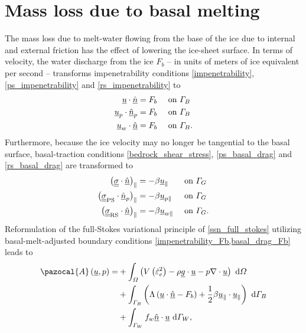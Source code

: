 \section{Mass loss due to basal melting} \label{ssn_mass_loss_due_to_melting}

The mass loss due to melt-water flowing from the base of the ice due to internal and external friction has the effect of lowering the ice-sheet surface.  In terms of velocity, the water discharge from the ice $F_b$ -- in units of meters of ice equivalent per second -- transforms impenetrability conditions \cref{impenetrability}, \cref{ps_impenetrability} and \cref{rs_impenetrability} to
\begin{align}
  \label{impenetrability_Fb}
  \underline{u} \cdot \underline{\hat{n}} &= F_b  &&\text{ on } \varGamma_B \\
  \label{ps_impenetrability_Fb}
  \underline{u}_p \cdot \underline{\hat{n}}_p &= F_b  &&\text{ on } \varGamma_B \\
  \label{rs_impenetrability_Fb}
  \underline{u}_w \cdot \underline{\hat{n}} &= F_b  &&\text{ on } \varGamma_B.
\end{align}
Furthermore, because the ice velocity may no longer be tangential to the basal surface, basal-traction conditions \cref{bedrock_shear_stress}, \cref{ps_basal_drag} and \cref{rs_basal_drag} are transformed to 
\begin{align}
  \label{basal_drag_Fb}
  \big( \underline{\underline{\sigma}} \cdot \underline{\hat{n}} \big)_{\Vert} &= -\beta \underline{u}_{\Vert} &&\text{ on } \varGamma_G \\
  \label{ps_basal_drag_Fb}
  \big( \underline{\underline{\sigma}}_{\text{PS}} \cdot \underline{\hat{n}}_p \big)_{\Vert} &= -\beta \underline{u}_{p\Vert} &&\text{ on } \varGamma_G \\
  \label{rs_basal_drag_Fb}
  \big( \underline{\underline{\sigma}}_{\text{RS}} \cdot \underline{\hat{n}} \big)_{\Vert} &= -\beta \underline{u}_{w\Vert} &&\text{ on } \varGamma_G.
\end{align}
Reformulation of the full-Stokes variational principle of \cref{ssn_full_stokes} utilizing basal-melt-adjusted boundary conditions \cref{impenetrability_Fb,basal_drag_Fb} leads to
\begin{align}
  \label{action_Fb}
  \pazocal{A} \left(\rankone{u}, p\right) = &+ \int_{\Omega} \left( V\left( \dot{\varepsilon}_e^2 \right) - \rho \rankone{g} \cdot \rankone{u} - p \nabla \cdot \rankone{u} \right) \d{\Omega} \notag \\
  &+ \int_{\Gamma_B} \left( \Lambda \left( \rankone{u} \cdot \normal - F_b \right) + \frac{1}{2} \beta \rankone{u}_{\Vert} \cdot \rankone{u}_{\Vert} \right) \d{\Gamma_B} \notag \\
  &+ \int_{\Gamma_W} f_w \normal \cdot \rankone{u} \d{\Gamma_W},
\end{align}
